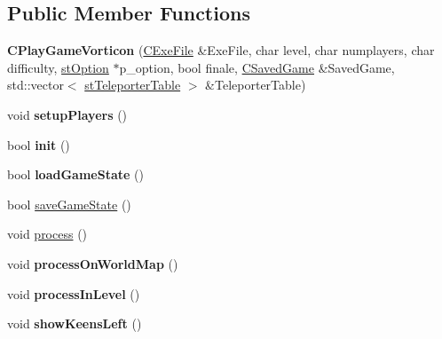 \subsection*{Public Member Functions}
\begin{DoxyCompactItemize}
\item 
\hypertarget{class_c_play_game_vorticon_a5410a0f606cb62d9c594328b1e67308e}{
{\bfseries CPlayGameVorticon} (\hyperlink{class_c_exe_file}{CExeFile} \&ExeFile, char level, char numplayers, char difficulty, \hyperlink{structst_option}{stOption} $\ast$p\_\-option, bool finale, \hyperlink{class_c_saved_game}{CSavedGame} \&SavedGame, std::vector$<$ \hyperlink{structst_teleporter_table}{stTeleporterTable} $>$ \&TeleporterTable)}
\label{class_c_play_game_vorticon_a5410a0f606cb62d9c594328b1e67308e}

\item 
\hypertarget{class_c_play_game_vorticon_aa05ca50f31def6714c0387e7e02cdd6d}{
void {\bfseries setupPlayers} ()}
\label{class_c_play_game_vorticon_aa05ca50f31def6714c0387e7e02cdd6d}

\item 
\hypertarget{class_c_play_game_vorticon_a1c8f2c6203e81647667c06aafb86498c}{
bool {\bfseries init} ()}
\label{class_c_play_game_vorticon_a1c8f2c6203e81647667c06aafb86498c}

\item 
\hypertarget{class_c_play_game_vorticon_a91d50d0e00306b3e944dc65806b97e61}{
bool {\bfseries loadGameState} ()}
\label{class_c_play_game_vorticon_a91d50d0e00306b3e944dc65806b97e61}

\item 
bool \hyperlink{class_c_play_game_vorticon_a092f1468065b0aa10759ce75f3367275}{saveGameState} ()
\item 
void \hyperlink{class_c_play_game_vorticon_aeda795f9cee02c61b274b4dd562c8b0f}{process} ()
\item 
\hypertarget{class_c_play_game_vorticon_a3634e5082043d596dda467155b28ef63}{
void {\bfseries processOnWorldMap} ()}
\label{class_c_play_game_vorticon_a3634e5082043d596dda467155b28ef63}

\item 
\hypertarget{class_c_play_game_vorticon_a375433440b5eb27e218d2bc4873be7b8}{
void {\bfseries processInLevel} ()}
\label{class_c_play_game_vorticon_a375433440b5eb27e218d2bc4873be7b8}

\item 
\hypertarget{class_c_play_game_vorticon_a47d4eb6e3334840b58c833ecda124476}{
void {\bfseries showKeensLeft} ()}
\label{class_c_play_game_vorticon_a47d4eb6e3334840b58c833ecda124476}


\end{DoxyCompactItemize}
